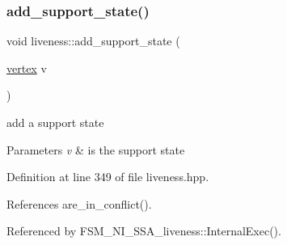 \subsubsection{\texorpdfstring{add\+\_\+support\+\_\+state()}{add\_support\_state()}}
{\footnotesize\ttfamily void liveness\+::add\+\_\+support\+\_\+state (\begin{DoxyParamCaption}\item[{\hyperlink{graph_8hpp_abefdcf0544e601805af44eca032cca14}{vertex}}]{v }\end{DoxyParamCaption})\hspace{0.3cm}{\ttfamily [inline]}}



add a support state 


\begin{DoxyParams}{Parameters}
{\em v} & is the support state \\
\hline
\end{DoxyParams}


Definition at line 349 of file liveness.\+hpp.



References are\+\_\+in\+\_\+conflict().



Referenced by F\+S\+M\+\_\+\+N\+I\+\_\+\+S\+S\+A\+\_\+liveness\+::\+Internal\+Exec().


